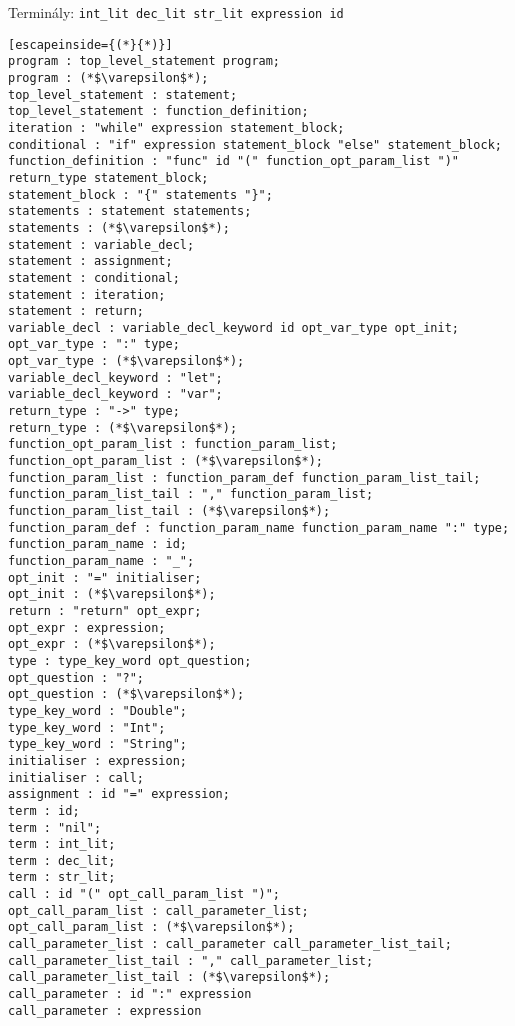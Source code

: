 \noindent Terminály: \lstinline{int_lit dec_lit str_lit expression id}

\begin{lstlisting}[escapeinside={(*}{*)}]
program : top_level_statement program;
program : (*$\varepsilon$*);
top_level_statement : statement;
top_level_statement : function_definition;
iteration : "while" expression statement_block;
conditional : "if" expression statement_block "else" statement_block;
function_definition : "func" id "(" function_opt_param_list ")" return_type statement_block;
statement_block : "{" statements "}";
statements : statement statements;
statements : (*$\varepsilon$*);
statement : variable_decl;
statement : assignment;
statement : conditional;
statement : iteration;
statement : return;
variable_decl : variable_decl_keyword id opt_var_type opt_init;
opt_var_type : ":" type;
opt_var_type : (*$\varepsilon$*);
variable_decl_keyword : "let";
variable_decl_keyword : "var";
return_type : "->" type;
return_type : (*$\varepsilon$*);
function_opt_param_list : function_param_list;
function_opt_param_list : (*$\varepsilon$*);
function_param_list : function_param_def function_param_list_tail;
function_param_list_tail : "," function_param_list;
function_param_list_tail : (*$\varepsilon$*);
function_param_def : function_param_name function_param_name ":" type;
function_param_name : id;
function_param_name : "_";
opt_init : "=" initialiser;
opt_init : (*$\varepsilon$*);
return : "return" opt_expr;
opt_expr : expression;
opt_expr : (*$\varepsilon$*);
type : type_key_word opt_question;
opt_question : "?";
opt_question : (*$\varepsilon$*);
type_key_word : "Double";
type_key_word : "Int";
type_key_word : "String";
initialiser : expression;
initialiser : call;
assignment : id "=" expression;
term : id;
term : "nil";
term : int_lit;
term : dec_lit;
term : str_lit;
call : id "(" opt_call_param_list ")";
opt_call_param_list : call_parameter_list;
opt_call_param_list : (*$\varepsilon$*);
call_parameter_list : call_parameter call_parameter_list_tail;
call_parameter_list_tail : "," call_parameter_list;
call_parameter_list_tail : (*$\varepsilon$*);
call_parameter : id ":" expression
call_parameter : expression
\end{lstlisting}
